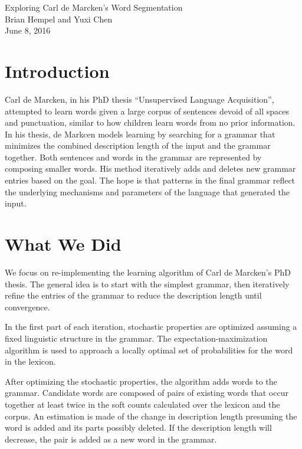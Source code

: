 \documentclass[11pt, oneside, fleqn]{article}
\begin{document}
  \begin{center}
  \LARGE{Exploring Carl de Marcken's Word Segmentation}\\[0.5em]
  \large{Brian Hempel and Yuxi Chen}\\[0.5em]
  \large{June 8, 2016}\\[0.5em]
  \end{center}

  \vspace{1em}

  \section*{Introduction}

  Carl de Marcken, in his PhD thesis ``Unsupervised Language Acquisition'', attempted to learn words given a large corpus of sentences devoid of all spaces and punctuation, similar to how children learn words from no prior information. In his thesis, de Markcen models learning by searching for a grammar that minimizes the combined description length of the input and the grammar together. Both sentences and words in the grammar are represented by composing smaller words. His method iteratively adds and deletes new grammar entries based on the goal. The hope is that patterns in the final grammar reflect the underlying mechanisms and parameters of the language that generated the input.
  
  \section*{What We Did}

  We focus on re-implementing the learning algorithm of Carl de Marcken's PhD thesis. The general idea is to start with the simplest grammar, then iteratively refine the entries of the grammar to reduce the description length until convergence. 
  
  In the first part of each iteration, stochastic properties are optimized assuming a fixed linguistic structure in the grammar. The expectation-maximization algorithm is used to approach a locally optimal set of probabilities for the word in the lexicon.
 
  After optimizing the stochastic properties, the algorithm adds words to the grammar. Candidate words are composed of pairs of existing words that occur together at least twice in the soft counts calculated over the lexicon and the corpus. An estimation is made of the change in description length presuming the word is added and its parts possibly deleted. If the description length will decrease, the pair is added as a new word in the grammar.
\end{document}
